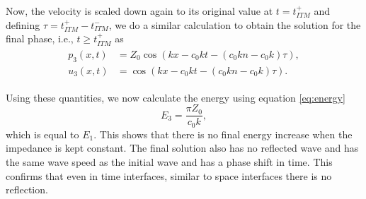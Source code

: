 
Now, the velocity is scaled down again to its original value at $t=t_{ITM}^+$ and defining $\tau = t_{ITM}^+ - t_{ITM}^-$, we do a similar calculation to obtain the solution for the final phase, i.e., $t \geq t_{ITM}^+$ as
\begin{align}
    \begin{split}
        p_3\left(x, t\right) & = Z_{0} \cos\left(kx - c_{0} k t - {\left(c_{0} k n - c_{0} k\right)} \tau\right) , \\
        u_3\left(x, t\right) & =  \cos\left(kx - c_{0} k t - {\left(c_{0} k n - c_{0} k\right)} \tau\right) . 
    \end{split}
\end{align}

Using these quantities, we now calculate the energy using equation \ref{eq:energy}
\begin{equation}
    E_3 = \frac{\pi Z_0}{c_0 k} ,
\end{equation}
which is equal to $E_1$. This shows that there is no final energy increase when the impedance is kept constant. The final solution also has no reflected wave and has the same wave speed as the initial wave and has a phase shift in time. This confirms that even in time interfaces, similar to space interfaces there is no reflection.


